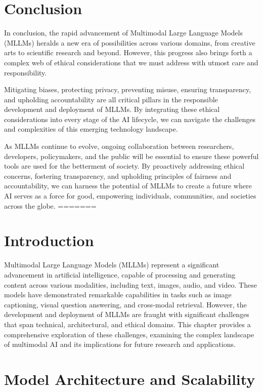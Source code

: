 \section{Conclusion}
In conclusion, the rapid advancement of Multimodal Large Language Models (MLLMs) heralds a new era of possibilities across various domains, from creative arts to scientific research and beyond. However, this progress also brings forth a complex web of ethical considerations that we must address with utmost care and responsibility.

Mitigating biases, protecting privacy, preventing misuse, ensuring transparency, and upholding accountability are all critical pillars in the responsible development and deployment of MLLMs. By integrating these ethical considerations into every stage of the AI lifecycle, we can navigate the challenges and complexities of this emerging technology landscape.

As MLLMs continue to evolve, ongoing collaboration between researchers, developers, policymakers, and the public will be essential to ensure these powerful tools are used for the betterment of society. By proactively addressing ethical concerns, fostering transparency, and upholding principles of fairness and accountability, we can harness the potential of MLLMs to create a future where AI serves as a force for good, empowering individuals, communities, and societies across the globe.
=======
\section{Introduction}
Multimodal Large Language Models (MLLMs) represent a significant advancement in artificial intelligence, capable of processing and generating content across various modalities, including text, images, audio, and video. These models have demonstrated remarkable capabilities in tasks such as image captioning, visual question answering, and cross-modal retrieval. However, the development and deployment of MLLMs are fraught with significant challenges that span technical, architectural, and ethical domains. This chapter provides a comprehensive exploration of these challenges, examining the complex landscape of multimodal AI and its implications for future research and applications.

\section{Model Architecture and Scalability}

